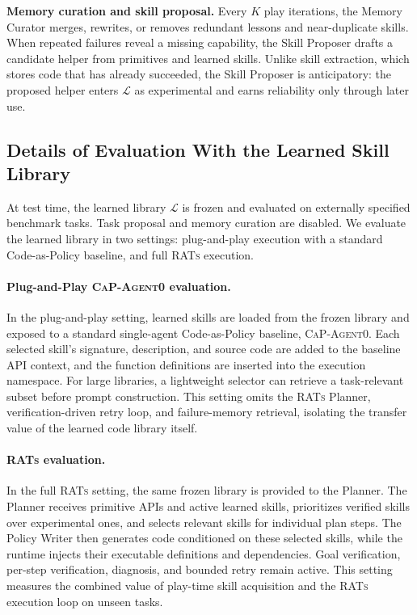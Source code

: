 \documentclass{llmxive}
\begin{document}
\textbf{Memory curation and skill proposal.}
Every $K$ play iterations, the Memory Curator merges, rewrites, or removes
redundant lessons and near-duplicate skills. When repeated failures reveal a
missing capability, the Skill Proposer drafts a candidate helper from
primitives and learned skills. Unlike skill extraction, which stores code that
has already succeeded, the Skill Proposer is anticipatory: the proposed helper
enters $\mathcal{L}$ as experimental and earns reliability only through later
use.

\subsection{Details of Evaluation With the Learned Skill Library}
\label{sec:appendix_test_time}


At test time, the learned library $\mathcal{L}$ is frozen and evaluated on
externally specified benchmark tasks. Task proposal and memory curation are disabled. We evaluate the learned library in two settings:
plug-and-play execution with a standard Code-as-Policy baseline, and full
\textsc{RATs} execution.


\paragraph{Plug-and-Play \textsc{CaP-Agent0} evaluation.}
In the plug-and-play setting, learned skills are loaded from the frozen library
and exposed to a standard single-agent Code-as-Policy baseline, \textsc{CaP-Agent0}.
Each selected skill's signature, description, and source code are added to the
baseline API context, and the function definitions are inserted into the
execution namespace. For large libraries, a lightweight selector can retrieve a
task-relevant subset before prompt construction. This setting omits the
\textsc{RATs} Planner, verification-driven retry loop, and failure-memory
retrieval, isolating the transfer value of the learned code library itself.

\paragraph{\textsc{RATs} evaluation.}
In the full \textsc{RATs} setting, the same frozen library is provided to the
Planner. The Planner receives primitive APIs and active learned skills,
prioritizes verified skills over experimental ones, and selects relevant skills
for individual plan steps. The Policy Writer then generates code conditioned on
these selected skills, while the runtime injects their executable definitions
and dependencies. Goal verification, per-step verification, diagnosis, and
bounded retry remain active. This setting measures the combined value of
play-time skill acquisition and the \textsc{RATs} execution loop on unseen
tasks.
\end{document}
